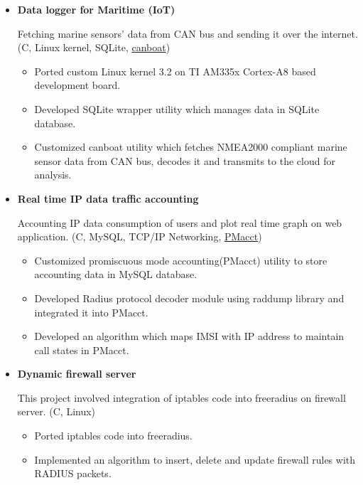 \documentclass[letterpaper,11pt]{article}
\newcommand{\resitem}[1]{\item #1 \vspace{-2pt}}
\begin{document}
\begin{itemize}
\item
    \textbf{Data logger for Maritime (IoT)}
	
    Fetching marine sensors' data from CAN bus and sending it over the internet. (C, Linux kernel, SQLite, \href{https://github.com/mehul-m-prajapati/canboat}{canboat})
    \vspace{-8pt}
    
	\begin{itemize}
	    \resitem{Ported custom Linux kernel 3.2 on TI AM335x Cortex-A8 based development board.}
	    
	    \resitem{Developed SQLite wrapper utility which manages data in SQLite database.}
	    
	    \resitem{Customized canboat utility which fetches NMEA2000 compliant marine sensor data from CAN bus, decodes it and transmits to the cloud for analysis.}

	\end{itemize}

\item
    \textbf{Real time IP data traffic accounting}
    
    Accounting IP data consumption of users and plot real time graph on web application. (C, MySQL, TCP/IP Networking, \href{https://github.com/mehul-m-prajapati/pmacct}{PMacct})
    \vspace{-8pt}

	\begin{itemize}
	    \resitem{Customized promiscuous mode accounting(PMacct) utility to store accounting data in MySQL database.}
	
	    \resitem{Developed Radius protocol decoder module using raddump library and integrated it into PMacct.}
	    
	    \resitem{Developed an algorithm which maps IMSI with IP address to maintain call states in PMacct.}
	    
	\end{itemize}
	
\item
	\textbf{Dynamic firewall server}
	
	This project involved integration of iptables code into freeradius on firewall server. (C, Linux)
    \vspace{-8pt}
	
	\begin{itemize}
	    \resitem{Ported iptables code into freeradius. }
	    
	    \resitem{Implemented an algorithm to insert, delete and update firewall rules with RADIUS packets.}
	
	\end{itemize}
	
\end{itemize}
\end{document}
